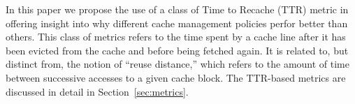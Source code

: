 In this paper we propose the use of a class of Time to Recache
(TTR) metric in offering insight into why different cache management
policies perfor better than others.  
This class of metrics refers to the time spent by a cache line after it has been
evicted from the cache and before being fetched again.  
It is related to, but distinct from, the notion of ``reuse distance,''
which refers to the amount of time between successive accesses to a
given cache block.
The TTR-based metrics are discussed in detail in
Section~\ref{sec:metrics}.
